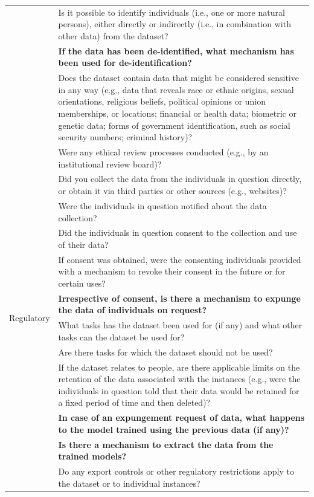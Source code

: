 \documentclass[journal]{IEEEtran}
\begin{document}
\begin{table}[]
\begin{tabular}{|p{}|p{}|}
& Is it possible to identify individuals (i.e., one or more natural persons), either directly or indirectly (i.e., in combination with other data) from the dataset?\\
& \textbf{If the data has been de-identified, what mechanism has been used for de-identification?} \\
 & Does the dataset contain data that might be considered sensitive in any way (e.g., data that reveals race or ethnic origins, sexual orientations, religious beliefs, political opinions or union memberships, or locations; financial or health data; biometric or genetic data; forms of government identification, such as social security numbers; criminal history)? \\ \hline
\multirow{13}{*}{Regulatory}    & Were any ethical review processes conducted (e.g., by an institutional review board)? \\
& Did you collect the data from the individuals in question directly, or obtain it via third parties or other sources (e.g., websites)?\\
& Were the individuals in question notified about the data collection?  \\
& Did the individuals in question consent to the collection and use of their data? \\
 & If consent was obtained, were the consenting individuals provided with a mechanism to revoke their consent in the future or for certain uses?  \\
 & \textbf{Irrespective of consent, is there a mechanism to expunge the data of individuals on request?}\\
 & What tasks has the dataset been used for (if any) and what other tasks can the dataset be used for? \\
& Are there tasks for which the dataset should not be used?  \\
 & If the dataset relates to people, are there applicable limits on the retention of the data associated with the instances (e.g., were the individuals in question told that their data would be retained for a fixed period of time and then deleted)? \\
& \textbf{In case of an expungement request of data, what happens to the model trained using the previous data (if any)?} \\
& \textbf{Is there a mechanism to extract the data from the trained models?} \\
& Do any export controls or other regulatory restrictions apply to the dataset or to individual instances?\\

\end{tabular}
\end{table}
\end{document}
